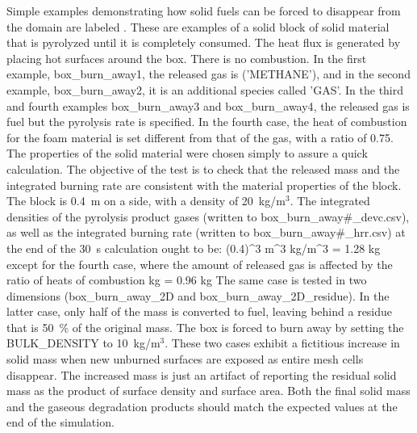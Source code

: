 \documentclass[11pt]{book}
\begin{document}
Simple examples demonstrating how solid fuels can be forced to disappear from the domain are labeled . These are examples of a solid block of solid material that is pyrolyzed until it is completely consumed. The heat flux is generated by placing hot surfaces around the box. There is no combustion. In the first
example, {\ct box\_burn\_away1}, the released gas is ({\ct 'METHANE'}), and in the second example, {\ct box\_burn\_away2}, it is an additional species called {\ct 'GAS'}. In the third and fourth examples {\ct box\_burn\_away3} and {\ct box\_burn\_away4}, the released gas is fuel but the pyrolysis rate is specified. In the fourth case, the heat of combustion for the foam material is set different from that of the gas, with a ratio of 0.75. The properties of the solid material were chosen simply to assure a quick calculation. The objective of the test is to
check that the released mass and the integrated burning rate are consistent with the material properties of the block. The block is 0.4~m on a side, with a density of 20~kg/m$^3$.  The integrated densities of the pyrolysis product gases (written to {\ct box\_burn\_away\#\_devc.csv}), as well as the integrated burning rate (written to {\ct box\_burn\_away\#\_hrr.csv}) at
the end of the 30~s calculation ought to be:
\be
(0.4)^3 \; \hbox{m}^3  \; \hbox{kg/m}^3 = 1.28 \; \hbox{kg}
\ee
except for the fourth case, where the amount of released gas is affected by the ratio of heats of combustion
  \; \hbox{kg}\; = 0.96 \; \hbox{kg}
\ee
The same case is tested in two dimensions ({\ct box\_burn\_away\_2D} and {\ct box\_burn\_away\_2D\_residue}). In the latter case, only half of the mass is converted to fuel, leaving behind a residue that is 50~\% of the original mass. The box is forced to burn away by setting the {\ct BULK\_DENSITY} to 10~kg/m$^3$. These two cases exhibit a fictitious increase in solid mass when new unburned surfaces are exposed as entire mesh cells disappear. The increased mass is just an artifact of reporting the residual solid mass as the product of surface density and surface area. Both the final solid mass and the gaseous degradation products should match the expected values at the end of the simulation.
\end{document}
